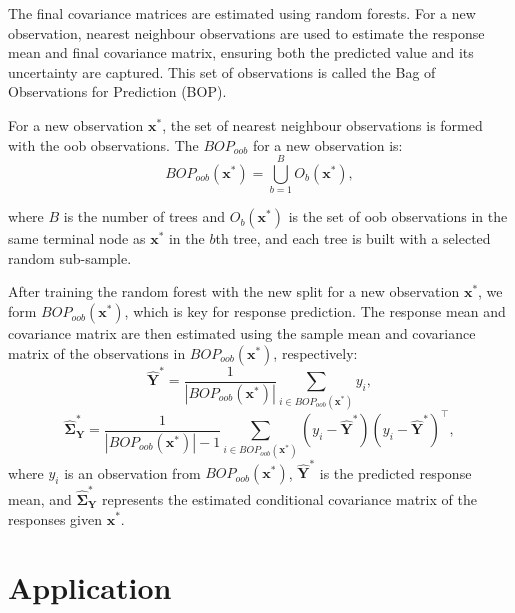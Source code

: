 \documentclass[11pt]{report} %
\begin{document}
\noindent The final covariance matrices are estimated using random forests. For a new observation, nearest neighbour observations are used to estimate the response mean and final covariance matrix, ensuring both the predicted value and its uncertainty are captured.\cite{alakus2023covariance} This set of observations is called the Bag of Observations for Prediction (BOP). 

For a new observation \( \mathbf{x}^* \), the set of nearest neighbour observations is formed with the oob observations.\cite{lu2021unified, alakus2021rfpredinterval} The \( BOP_{oob} \) for a new observation is:
\[
BOP_{oob}(\mathbf{x}^*) = \bigcup_{b=1}^{B} O_b(\mathbf{x}^*),
\]

\noindent where \( B \) is the number of trees and \( O_b(\mathbf{x}^*) \) is the set of oob observations in the same terminal node as \( \mathbf{x}^* \) in the \( b \)th tree, and each tree is built with a selected random sub-sample.\cite{alakus2023covariance}

After training the random forest with the new split for a new observation \( \mathbf{x}^* \), we form \( BOP_{oob}(\mathbf{x}^*) \), which is key for response prediction.\cite{alakus2023covariance} The response mean and covariance matrix are then estimated using the sample mean and covariance matrix of the observations in \( BOP_{oob}(\mathbf{x}^*) \), respectively:
\[
\hat{\mathbf{Y}}^* = \frac{1}{|BOP_{oob}(\mathbf{x}^*)|} \sum_{i \in BOP_{oob}(\mathbf{x}^*)} y_i,
\]
\[
\hat{\mathbf{\Sigma}}_\mathbf{Y}^* = \frac{1}{|BOP_{oob}(\mathbf{x}^*)| - 1} \sum_{i \in BOP_{oob}(\mathbf{x}^*)} (y_i - \hat{\mathbf{Y}}^*)(y_i - \hat{\mathbf{Y}}^*)^\top,
\]
where $y_i$ is an observation from $BOP_{oob}(\mathbf{x}^*)$, \( \hat{\mathbf{Y}}^* \) is the predicted response mean, and \( \hat{\mathbf{\Sigma}}_\mathbf{Y}^* \) represents the estimated conditional covariance matrix of the responses given $\mathbf{x}^*$.

\section{Application}
\end{document}
